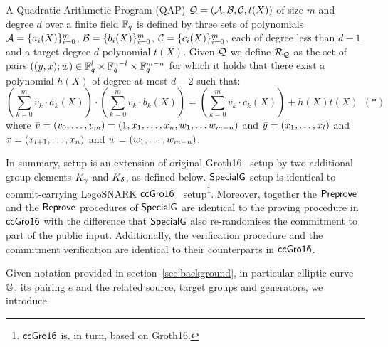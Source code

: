 \begin{definition}[QAP] 
\label{def:QAP}
A Quadratic Arithmetic Program (QAP) $\mathcal{Q} = (\mathcal{A}, \mathcal{B}, \mathcal{C}, t(X))$ of size $m$ 
and degree $d$ over a finite field $\mathbb{F}_q$ is defined by three sets of polynomials $\mathcal{A} = \{a_i(X)\}_{i=0}^m$, 
$\mathcal{B} = \{b_i(X)\}_{i=0}^m$, $\mathcal{C} = \{c_i(X)\}_{i=0}^m$, each of degree less than $d-1$ and a target degree $d$ polynomial $t(X)$. Given 
$\mathcal{Q}$ we define $\mathcal{R}_{\mathcal{Q}}$ as the set of pairs $((\bar{y}, \bar{x}); \bar{w}) \in \mathbb{F}_q^{l} \times \mathbb{F}_q^{n-l} \times \mathbb{F}_q^{m-n}$ for which it 
holds that there exist a polynomial $h(X)$ of degree at most $d-2$ such that:
$$(\sum_{k=0}^m v_k \cdot a_k(X)) \cdot (\sum_{k=0}^m v_k \cdot b_k(X)) = (\sum_{k=0}^m v_k \cdot c_k(X)) + h(X)t(X) \ \ (\ast)$$ 
where $\bar{v} = (v_0, \ldots, v_m) = (1, x_1, \ldots, x_n, w_1, \ldots w_{m-n})$ and $\bar{y} = (x_1, \ldots, x_l)$ and 
$\bar{x} = (x_{l+1}, \ldots, x_n)$ and $\bar{w} = (w_1, \ldots, w_{m-n})$. 
\end{definition}

\noindent In summary, \SpecialG setup is an extension of original Groth16~\cite{Groth16} setup by two additional 
group elements $K_{\gamma}$ and $K_{\delta}$, as defined below. ${\mathsf{SpecialG}}$ setup is identical to commit-carrying 
LegoSNARK ${\mathsf{ccGro16}}$~\cite[Fig.~22]{LegoSNARK} setup\footnote{${\mathsf{ccGro16}}$ is, in turn, based on  Groth16.}.
Moreover, together the ${\mathsf{Preprove}}$ and the ${\mathsf{Reprove}}$ procedures of ${\mathsf{SpecialG}}$ are identical to the proving  
procedure in ${\mathsf{ccGro16}}$ with the difference that ${\mathsf{SpecialG}}$ also re-randomises the commitment to part 
of the public input. Additionally, the verification procedure and the commitment verification are identical to their 
counterparts in ${\mathsf{ccGro16}}$. 

\noindent Given notation provided in section~\ref{sec:background}, in particular elliptic curve ${\mathbb{G}}$, its pairing $e$ and 
the related source, target groups and generators, we introduce%

